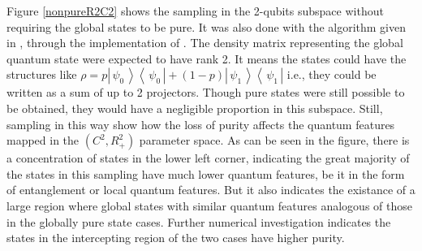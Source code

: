 \documentclass[aps,prl,preprint]{revtex4-1}
\newcommand{\bra}[1]{\ensuremath{\left\langle\, #1\,\right|}}
\newcommand{\ket}[1]{\ensuremath{\left|\,#1\,\right\rangle}}
\begin{document}
	Figure \ref{nonpureR2C2} shows the sampling in the 2-qubits subspace without
	requiring the global states to be pure. It was also done with
	the algorithm given in \cite{ginibre2009}, through the implementation of
	\cite{Qutip1}. The density matrix representing the global quantum state
	were expected to have rank 2. It means the states could have the structures like
	$\rho = p\ket{\psi_0}\bra{\psi_0}+(1-p)\ket{\psi_1}\bra{\psi_1}$ i.e., they could be
	written as a sum of up to 2 projectors. 
	Though pure states were still possible to be obtained, 
	they would have a negligible proportion in this subspace. Still, sampling in this
	way show how the loss of purity affects the quantum features mapped in 
	the $(C^2, R_+^2)$ parameter space. As can be seen in the figure, there is
	a concentration of states in the lower left corner, indicating the great
	majority of the states in this sampling have much lower quantum features,
	be it in the form of entanglement or local quantum features. But it 
	also indicates the existance of a large region where global states with similar quantum
	features analogous of those in the globally pure state cases. 
	Further numerical investigation indicates the states in the intercepting region
	of the two cases have higher purity.
	
\end{document}
